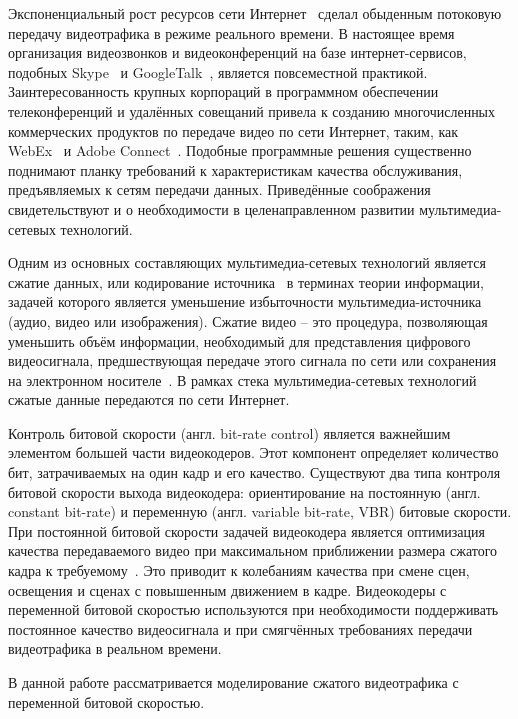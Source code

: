 \label{sec:intro}

Экспоненциальный рост ресурсов сети Интернет~\cite{}
сделал обыденным
потоковую передачу видеотрафика в режиме реального времени.
В настоящее время организация видеозвонков и видеоконференций
на базе интернет-сервисов, подобных Skype~\cite{} и
GoogleTalk~\cite{}, является повсеместной практикой.
Заинтересованность крупных корпораций в программном
обеспечении телеконференций и удалённых совещаний
привела к созданию многочисленных коммерческих продуктов
по передаче видео по сети Интернет, таким, как WebEx~\cite{}
и Adobe Connect~\cite{}. Подобные программные решения
существенно поднимают планку требований к характеристикам
качества обслуживания, предъявляемых к сетям передачи
данных. Приведённые соображения свидетельствуют и о
необходимости в целенаправленном развитии мультимедиа-сетевых
технологий.

Одним из основных составляющих мультимедиа-сетевых технологий
является сжатие данных, или кодирование источника~\cite{}
в терминах теории информации, задачей которого является
уменьшение избыточности мультимедиа-источника (аудио,
видео или изображения). Сжатие видео -- это процедура,
позволяющая уменьшить объём информации, необходимый
для представления цифрового видеосигнала, предшествующая передаче
этого сигнала по сети или сохранения на электронном носителе~\cite{}.
В рамках стека мультимедиа-сетевых технологий сжатые данные
передаются по сети Интернет.

Контроль битовой скорости (англ. bit-rate control) является
важнейшим элементом большей части видеокодеров. Этот
компонент определяет количество бит, затрачиваемых на один
кадр и его качество. Существуют два типа контроля битовой
скорости выхода видеокодера: ориентирование на постоянную
(англ. constant bit-rate) и переменную (англ. variable bit-rate, VBR)
битовые скорости. При постоянной битовой скорости задачей
видеокодера является оптимизация качества передаваемого
видео при максимальном приближении размера сжатого кадра
к требуемому~\cite{}. Это приводит к колебаниям качества
при смене сцен, освещения и сценах с повышенным
движением в кадре. Видеокодеры с переменной битовой
скоростью используются при необходимости поддерживать постоянное
качество видеосигнала и при смягчённых требованиях
передачи видеотрафика в реальном времени.

В данной работе рассматривается моделирование
сжатого видеотрафика с переменной битовой скоростью.


